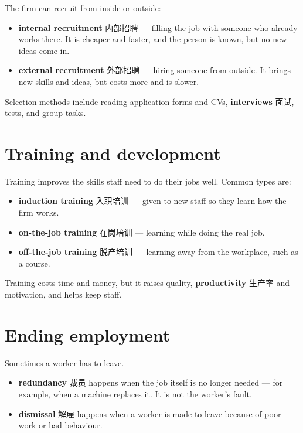\documentclass[11pt]{article}
\begin{document}
The firm can recruit from inside or outside:

\begin{itemize}
\item \textbf{internal recruitment} 内部招聘 — filling the job with someone who already works there. It is cheaper and faster, and the person is known, but no new ideas come in.

\item \textbf{external recruitment} 外部招聘 — hiring someone from outside. It brings new skills and ideas, but costs more and is slower.

\end{itemize}

Selection methods include reading application forms and CVs, \textbf{interviews} 面试, tests, and group tasks.

\section*{Training and development}

Training improves the skills staff need to do their jobs well. Common types are:

\begin{itemize}
\item \textbf{induction training} 入职培训 — given to new staff so they learn how the firm works.

\item \textbf{on-the-job training} 在岗培训 — learning while doing the real job.

\item \textbf{off-the-job training} 脱产培训 — learning away from the workplace, such as a course.

\end{itemize}

Training costs time and money, but it raises quality, \textbf{productivity} 生产率 and motivation, and helps keep staff.

\section*{Ending employment}

Sometimes a worker has to leave.

\begin{itemize}
\item \textbf{redundancy} 裁员 happens when the job itself is no longer needed — for example, when a machine replaces it. It is not the worker's fault.

\item \textbf{dismissal} 解雇 happens when a worker is made to leave because of poor work or bad behaviour.

\end{itemize}
\end{document}
